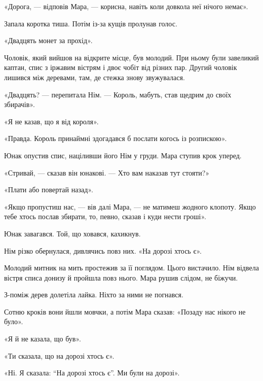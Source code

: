 \documentclass[10pt,a4paper]{article}
\begin{document}
«Дорога, --- відповів Мара, --- корисна, навіть коли довкола неї нічого немає».

Запала коротка тиша. Потім із-за кущів пролунав голос.

«Двадцять монет за прохід».

Чоловік, який вийшов на відкрите місце, був молодий. При ньому були завеликий каптан, спис з іржавим вістрям і двоє чобіт від різних пар. Другий чоловік лишився між деревами, там, де стежка знову звужувалася.

«Двадцять? --- перепитала Нім. --- Король, мабуть, став щедрим до своїх збирачів».

«Я не казав, що я від короля».

«Правда. Король принаймні здогадався б послати когось із розпискою».

Юнак опустив спис, націливши його Нім у груди. Мара ступив крок уперед.

«Стривай, --- сказав він юнакові. --- Хто вам наказав тут стояти?»

«Плати або повертай назад».

«Якщо пропустиш нас, --- вів далі Мара, --- не матимеш жодного клопоту. Якщо тебе хтось послав збирати, то, певно, сказав і куди нести гроші».

Юнак завагався. Той, що ховався, кахикнув.

Нім різко обернулася, дивлячись повз них. «На дорозі хтось є».

Молодий митник на мить простежив за її поглядом. Цього вистачило. Нім відвела вістря списа донизу й пройшла повз нього. Мара рушив слідом, не біжучи.

З-поміж дерев долетіла лайка. Ніхто за ними не погнався.

Сотню кроків вони йшли мовчки, а потім Мара сказав: «Позаду нас нікого не було».

«Я й не казала, що був».

«Ти сказала, що на дорозі хтось є».

«Ні. Я сказала: “На дорозі хтось є”. Ми були на дорозі».
\end{document}
